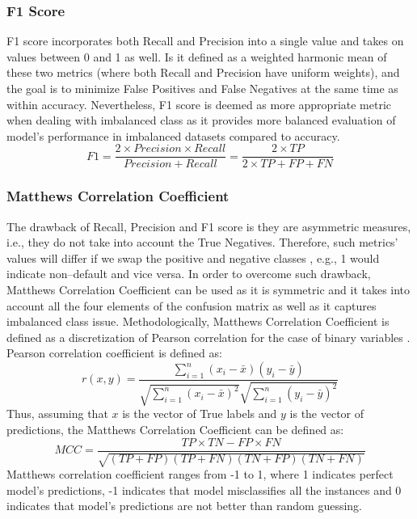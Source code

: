 \subsubsection{F1 Score}
F1 score incorporates both Recall and Precision into a single value and takes on values between 0 and 1 as well.
Is it defined as a weighted harmonic mean of these two metrics \citep{brabec2020model} (where both Recall and Precision have uniform weights), and the goal is to minimize False Positives and False Negatives at the same time as within accuracy.
Nevertheless, F1 score is deemed as more appropriate metric when dealing with imbalanced class as it provides more balanced evaluation of model's performance in imbalanced datasets compared to accuracy.
\begin{equation}\label{eq}
    F1 = \frac{2 \times Precision \times Recall}{Precision + Recall} = \frac{2 \times TP}{2 \times TP + FP + FN}
\end{equation}

\subsubsection{Matthews Correlation Coefficient}
The drawback of Recall, Precision and F1 score is they are asymmetric measures, i.e., they do not take into account the True Negatives.
Therefore, such metrics' values will differ if we swap the positive and negative classes \citep{chicco2020advantages}, e.g., 1 would indicate non--default and vice versa.
In order to overcome such drawback, Matthews Correlation Coefficient can be used as it is symmetric and it takes into account all the four elements of the confusion matrix as well as it captures imbalanced class issue.
Methodologically, Matthews Correlation Coefficient is defined as a discretization of Pearson correlation for the case of binary variables \citep{boughorbel2017optimal}.
Pearson correlation coefficient is defined as:
\begin{equation}\label{eq}
    r(x,y) = \frac{\sum\limits_{i=1}^n (x_i - \bar{x})(y_i - \bar{y})}{\sqrt{\sum\limits_{i=1}^n (x_i - \bar{x})^2} \sqrt{\sum\limits_{i=1}^n (y_i - \bar{y})^2}}
\end{equation}
Thus, assuming that $x$ is the vector of True labels and $y$ is the vector of predictions, the Matthews Correlation Coefficient can be defined as:
\begin{equation}\label{eq}
    MCC = \frac{TP \times TN - FP \times FN}{\sqrt{(TP + FP) (TP + FN) (TN + FP) (TN + FN)}}
\end{equation}
Matthews correlation coefficient ranges from -1 to 1, where 1 indicates perfect model's predictions, -1 indicates that model misclassifies all the instances and 0 indicates that model's predictions are not better than random guessing.
